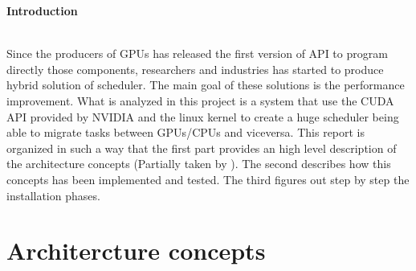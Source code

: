 \documentclass[a4paper,13pt]{article}
\newenvironment*{myabstract}{\begin{Large}\bf}{\end{Large}\\[2.5ex]}%
\begin{document}
\vspace{4ex}	%
\begin{multicols}{2}

\begin{myabstract} Introduction \end{myabstract}
Since the producers of GPUs has released the first version of API to program directly those 
components, researchers and industries has started to produce hybrid solution of scheduler. 
The main goal of these solutions is the performance improvement. What is analyzed in this project is 
a system that use the CUDA API\cite{cuda} provided by NVIDIA and the linux kernel to create a huge scheduler
being able to migrate tasks between GPUs/CPUs and viceversa. This report is organized in such a way
that the first part provides an high level description of the architecture concepts (Partially taken by \cite{paper_hetsched}). The 
second describes how this concepts has been implemented and tested. The third figures out step by step
the installation phases. 




\section{Architercture concepts} 


\end{multicols}
\end{document}
